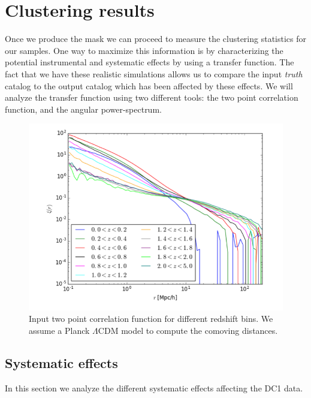 \documentclass[\docopts]{\docclass}
\begin{document}

\section{Clustering results}
\label{sec:results}

Once we produce the mask we can proceed to measure the clustering statistics for our samples. One way to maximize this information is by characterizing the potential instrumental and systematic effects by using a transfer function. The fact that we have these realistic simulations allows us to compare the input \textit{truth} catalog to the output catalog which has been affected by these effects. We will analyze the transfer function using two different tools: the two point correlation function, and the angular power-spectrum. 


\begin{figure}
\centering
\includegraphics[width=0.9\columnwidth]{input_cf.png}
\caption{Input two point correlation function for different redshift bins. We assume a Planck $\Lambda$CDM model to compute the comoving distances.}
\label{fig:input_corr}
\end{figure}

\subsection{Systematic effects}

In this section we analyze the different systematic effects affecting the DC1 data.
\end{document}
